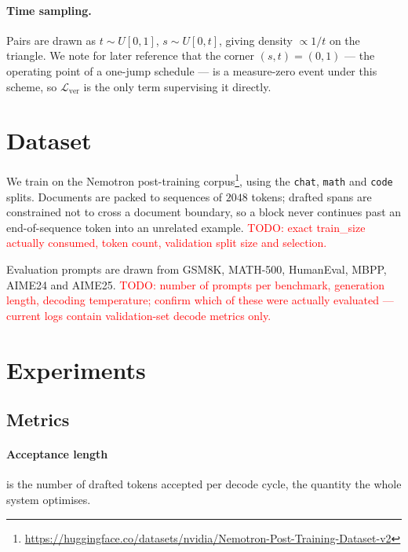 \documentclass{zapiski}
\newcommand{\cm}[1]{\textcolor{red}{#1}}
\begin{document}
\paragraph{Time sampling.} Pairs are drawn as $t \sim U[0,1]$, $s \sim U[0,t]$,
giving density $\propto 1/t$ on the triangle. We note for later reference that
the corner $(s,t) = (0,1)$ --- the operating point of a one-jump schedule --- is
a measure-zero event under this scheme, so $\mathcal{L}_{\mathrm{ver}}$ is the
only term supervising it directly.

\section{Dataset}
\label{sec:data}

We train on the Nemotron post-training corpus\footnote{\url{https://huggingface.co/datasets/nvidia/Nemotron-Post-Training-Dataset-v2}},
using the \texttt{chat}, \texttt{math} and \texttt{code} splits. Documents are
packed to sequences of $2048$ tokens; drafted spans are constrained not to
cross a document boundary, so a block never continues past an end-of-sequence
token into an unrelated example. \cm{TODO: exact train\_size actually consumed,
token count, validation split size and selection.}

Evaluation prompts are drawn from GSM8K, MATH-500, HumanEval, MBPP, AIME24 and
AIME25. \cm{TODO: number of prompts per benchmark, generation length, decoding
temperature; confirm which of these were actually evaluated --- current logs
contain validation-set decode metrics only.}

\section{Experiments}
\label{sec:experiments}

\subsection{Metrics}

\paragraph{Acceptance length} is the number of drafted tokens accepted per
decode cycle, the quantity the whole system optimises.
\end{document}
